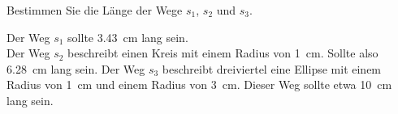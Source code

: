 
\begin{aufgabe}
	Bestimmen Sie die Länge der Wege $s_1$, $s_2$ und $s_3$.

\begin{center}
\end{center}

\begin{loesung}
	Der Weg $s_1$ sollte \SI{3.43}{cm} lang sein.\\
	Der Weg $s_2$ beschreibt einen Kreis mit einem Radius von \SI{1}{cm}. Sollte also \SI{6.28}{cm} lang sein.
	Der Weg $s_3$ beschreibt dreiviertel eine Ellipse mit einem Radius von \SI{1}{cm} und einem Radius von \SI{3}{cm}. 
	Dieser Weg sollte etwa \SI{10}{cm} lang sein.
\end{loesung}


\end{aufgabe}

